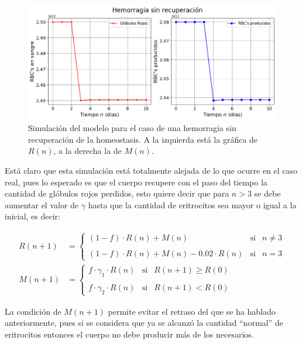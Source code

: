 \begin{figure}[H]
    \centering
    \captionsetup{justification=centering}
    \includegraphics[scale=0.534]{figures/HemoLeveG1.png}
    \caption{Simulación del modelo para el caso de una hemorragia sin recuperación de la homeostasis. A la izquierda está la gráfica de $R(n)$, a la derecha la de $M(n)$.}
    \label{sec:variaciones:fig:HemoLeveG1}
\end{figure}

Está claro que esta simulación está totalmente alejada de lo que ocurre en el caso real, pues lo esperado es que el cuerpo recupere con el paso del tiempo la cantidad de glóbulos rojos perdidos, esto quiere decir que para $n>3$ se debe aumentar el valor de $\gamma$ hasta que la cantidad de eritrocitos sea mayor o igual a la inicial, es decir:

\begin{align}\label{eq:HemoLeveBien}
    R(n+1) &= \left\{ \begin{array}{lcc} (1-f)\cdot R(n)+M(n) & \textrm{si} & n \neq 3 \\ \\ (1-f)\cdot R(n)+M(n)-0.02\cdot R(n) & \textrm{si} & n = 3\end{array} \right. \\
    M(n+1) &=\left\{ \begin{array}{lcc} f\cdot \gamma_1 \cdot R(n) & \textrm{si} & R(n+1) \geq R(0) \\ \\ f\cdot \gamma_2\cdot R(n) & \textrm{si} & R(n+1)<R(0)\end{array} \right. \nonumber
\end{align}

La condición de $M(n+1)$ permite evitar el retraso del que se ha hablado anteriormente, pues si se considera que ya se alcanzó la cantidad ``normal'' de eritrocitos entonces el cuerpo no debe producir más de los necesarios.

